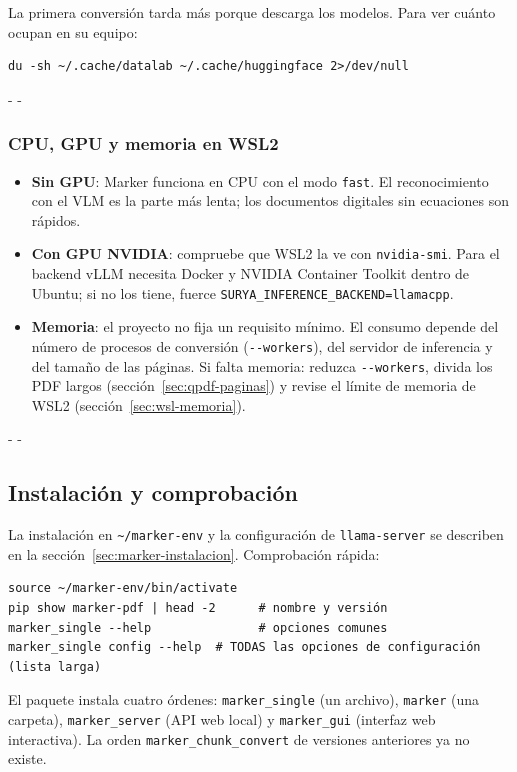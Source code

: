 \documentclass[11pt,a4paper]{article}
\makeatletter
\newcommand{\necesitaespacio}[1]{\par\penalty-100\begingroup
	\setlength{\dimen@}{#1}\dimen@ii\pagegoal\advance\dimen@ii-\pagetotal
	\ifdim\dimen@>\dimen@ii\ifdim\dimen@ii>\z@\vfil\fi\penalty-\@M\fi\endgroup}
\newcommand{\cmd}[1]{\texttt{\textcolor{colcmd}{#1}}}      %
\newcommand{\opt}[1]{\texttt{\textcolor{colopt}{#1}}}      %
\newcommand{\arch}[1]{\texttt{\textcolor{colarch}{#1}}}    %
\newcommand{\val}[1]{\texttt{#1}}                          %
\newcommand{\tl}{\textasciitilde{}}  %
\makeatother
\begin{document}
	La primera conversión tarda más porque descarga los modelos. Para ver cuánto ocupan en su equipo:
	
	\begin{lstlisting}
du -sh ~/.cache/datalab ~/.cache/huggingface 2>/dev/null
\end{lstlisting}
	
	\necesitaespacio{6\baselineskip}
	\subsubsection{CPU, GPU y memoria en WSL2}
	
	\begin{itemize}
		\item \textbf{Sin GPU}: Marker funciona en CPU con el modo \val{fast}. El reconocimiento con el VLM es la parte más lenta; los documentos digitales sin ecuaciones son rápidos.
		\item \textbf{Con GPU NVIDIA}: compruebe que WSL2 la ve con \cmd{nvidia-smi}. Para el backend vLLM necesita Docker y NVIDIA Container Toolkit dentro de Ubuntu; si no los tiene, fuerce \texttt{SURYA\_\allowbreak{}INFERENCE\_\allowbreak{}BACKEND=\allowbreak{}llamacpp}.
		\item \textbf{Memoria}: el proyecto no fija un requisito mínimo. El consumo depende del número de procesos de conversión (\opt{-{}-workers}), del servidor de inferencia y del tamaño de las páginas. Si falta memoria: reduzca \opt{-{}-workers}, divida los PDF largos (sección~\ref{sec:qpdf-paginas}) y revise el límite de memoria de WSL2 (sección~\ref{sec:wsl-memoria}).
	\end{itemize}
	
	\necesitaespacio{8\baselineskip}
	\subsection{Instalación y comprobación}
	
	La instalación en \arch{\tl/marker-env} y la configuración de \cmd{llama-server} se describen en la sección~\ref{sec:marker-instalacion}. Comprobación rápida:
	
	\begin{lstlisting}
source ~/marker-env/bin/activate
pip show marker-pdf | head -2      # nombre y versión
marker_single --help               # opciones comunes
marker_single config --help  # TODAS las opciones de configuración (lista larga)
\end{lstlisting}
	
	\begin{nota}
		El paquete instala cuatro órdenes: \cmd{marker\_single} (un archivo), \cmd{marker} (una carpeta), \cmd{marker\_server} (API web local) y \cmd{marker\_gui} (interfaz web interactiva). La orden \cmd{marker\_\allowbreak{}chunk\_\allowbreak{}convert} de versiones anteriores ya no existe.
	\end{nota}
	
\end{document}
